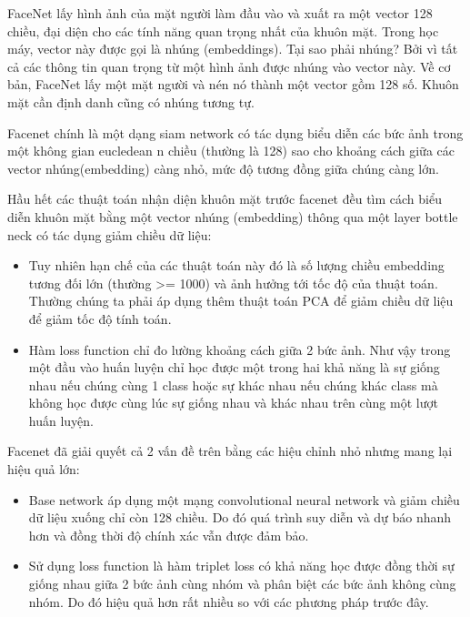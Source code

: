 FaceNet lấy hình ảnh của mặt người làm đầu vào và xuất ra một vector 128 chiều,
đại diện cho các tính năng quan trọng nhất của khuôn mặt.
Trong học máy, vector này được gọi là nhúng (embeddings).
Tại sao phải nhúng? Bởi vì tất cả các thông tin quan trọng từ một hình ảnh được nhúng
vào vector này. Về cơ bản, FaceNet lấy một mặt người và nén nó thành một vector gồm 128 số.
Khuôn mặt cần định danh cũng có nhúng tương tự.

Facenet chính là một dạng siam network có tác dụng biểu diễn các bức ảnh trong một không
gian eucledean n chiều (thường là 128) sao cho khoảng cách giữa các vector nhúng(embedding)
càng nhỏ, mức độ tương đồng giữa chúng càng lớn.

Hầu hết các thuật toán nhận diện khuôn mặt trước facenet đều tìm cách biểu diễn
khuôn mặt bằng một vector nhúng (embedding) thông qua một layer bottle neck có tác dụng
giảm chiều dữ liệu: 

\begin{itemize}
    \item Tuy nhiên hạn chế của các thuật toán này đó là số lượng chiều embedding
          tương đối lớn (thường >= 1000) và ảnh hưởng tới tốc độ của thuật toán.
          Thường chúng ta phải áp dụng thêm thuật toán PCA để giảm chiều dữ liệu để giảm
          tốc độ tính toán.
    \item Hàm loss function chỉ đo lường khoảng cách giữa 2 bức ảnh.
          Như vậy trong một đầu vào huấn luyện chỉ học được một trong hai khả năng
          là sự giống nhau nếu chúng cùng 1 class hoặc sự khác nhau nếu chúng khác
          class mà không học được cùng lúc sự giống nhau và khác nhau trên cùng một
          lượt huấn luyện.
\end{itemize}

Facenet đã giải quyết cả 2 vấn đề trên bằng các hiệu chỉnh nhỏ nhưng mang lại hiệu quả lớn: 

\begin{itemize}
    \item Base network áp dụng một mạng convolutional neural network và giảm chiều dữ
          liệu xuống chỉ còn 128 chiều. Do đó quá trình suy diễn và dự báo nhanh hơn và
          đồng thời độ chính xác vẫn được đảm bảo.
    \item Sử dụng loss function là hàm triplet loss có khả năng học được đồng thời
          sự giống nhau giữa 2 bức ảnh cùng nhóm và phân biệt các bức ảnh không cùng nhóm.
          Do đó hiệu quả hơn rất nhiều so với các phương pháp trước đây.
\end{itemize}

